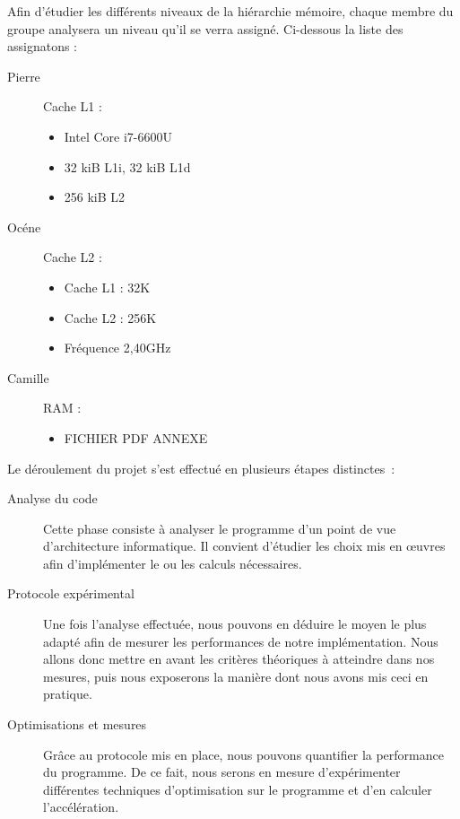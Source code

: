 \documentclass[12pt,a4paper]{article}
\begin{document}
Afin d'étudier les différents niveaux de la hiérarchie mémoire, chaque membre du
groupe analysera un niveau qu'il se verra assigné. Ci-dessous la liste des
assignatons :
\begin{description}

    \item[Pierre] Cache L1 : 
        \begin{itemize}
            \item Intel Core i7-6600U
            \item 32 kiB L1i, 32 kiB L1d
            \item 256 kiB L2
        \end{itemize}
    \item[Océne ] Cache L2 : 
        \begin{itemize}
            \item Cache L1 : 32K
            \item Cache L2 : 256K
            \item Fréquence 2,40GHz
        \end{itemize}
    \item[Camille] RAM : 
        \begin{itemize}
            \item FICHIER PDF ANNEXE
        \end{itemize}
\end{description} 

Le déroulement du projet s'est effectué en plusieurs étapes distinctes :
\begin{description}
    \item[Analyse du code] Cette phase consiste à analyser le programme d'un
        point de vue d'architecture informatique. Il convient d'étudier les
        choix mis en œuvres afin d'implémenter le ou les calculs nécessaires.
    \item[Protocole expérimental] Une fois l'analyse effectuée, nous
        pouvons en déduire le moyen le plus adapté afin de mesurer les
        performances de notre implémentation. Nous allons donc mettre en
        avant les critères théoriques à atteindre dans nos mesures, puis
        nous exposerons la manière dont nous avons mis ceci en pratique.
    \item[Optimisations et mesures] Grâce au protocole mis en place, nous
        pouvons quantifier la performance du programme. De ce fait, nous serons
        en mesure d'expérimenter différentes techniques d'optimisation sur le
        programme et d'en calculer l'accélération.
\end{description}
\end{document}
